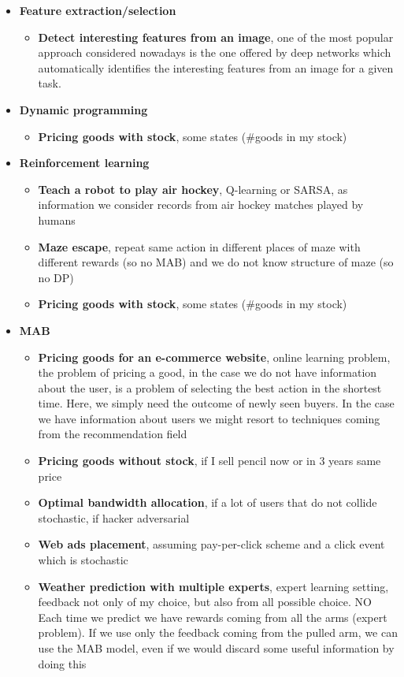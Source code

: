 \begin{itemize}
        \item \textbf{Feature extraction/selection}
        \begin{itemize}
            \item \textbf{Detect interesting features from an image}, one of the most popular approach considered nowadays is the one offered by deep networks which automatically identifies the interesting features from an image for a given task.
        \end{itemize}
        \item \textbf{Dynamic programming}
        \begin{itemize}
            \item \textbf{Pricing goods with stock}, some states (\#goods in my stock)
        \end{itemize}
        \item \textbf{Reinforcement learning}
        \begin{itemize}
            \item \textbf{Teach a robot to play air hockey}, Q-learning or SARSA, as information we consider records from air hockey matches played by humans
            \item \textbf{Maze escape}, repeat same action in different places of maze with different rewards (so no MAB) and we do not know structure of maze (so no DP)
            \item \textbf{Pricing goods with stock}, some states (\#goods in my stock)
        \end{itemize}
        \item \textbf{MAB}
        \begin{itemize}
            \item \textbf{Pricing goods for an e-commerce website}, online learning problem, the problem of pricing a good, in the case we do not have information about the user, is a problem of selecting the best action in the shortest time. Here, we simply need the outcome of newly seen buyers. In the case we have information about users we might resort to techniques
            coming from the recommendation field
            \item \textbf{Pricing goods without stock}, if I sell pencil now or in 3 years same price
            \item \textbf{Optimal bandwidth allocation}, if a lot of users that do not collide stochastic, if hacker adversarial
            \item \textbf{Web ads placement}, assuming pay-per-click scheme and a click event which is stochastic
            \item \textbf{Weather prediction with multiple experts}, expert learning setting, feedback not only of my choice, but also from all possible choice. NO Each time we predict we have rewards coming from all the arms (expert problem). If we use only the feedback coming from the pulled arm, we can use the MAB model, even if we would discard some useful information by doing this
        \end{itemize}
    \end{itemize}

